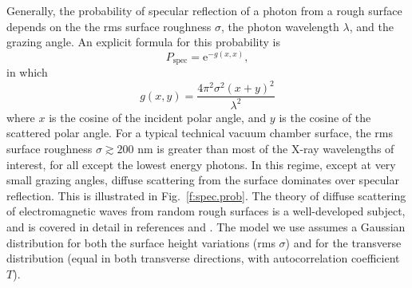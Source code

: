 \documentclass[11pt,openany]{report}
\begin{document}
Generally, the probability of specular reflection of a photon from a
rough surface depends on the the rms surface roughness $\sigma$, the
photon wavelength $\lambda$, and the grazing angle. An explicit
formula for this probability is~\cite{b:beckmann}
   \begin{equation}
P_{\textrm{spec}}=\textrm{e}^{-g(x,x)},
\end{equation}
in which
   \begin{equation}
g(x,y)=\frac{4\pi^{2}\sigma^{2}(x+y)^{2}}{\lambda^{2}}
  \end{equation}
where $x$ is the cosine of the incident polar angle, and $y$ is the
cosine of the scattered polar angle. For a typical technical vacuum
chamber surface, the rms surface roughness $\sigma \gtrsim 200$ nm is
greater than most of the X-ray wavelengths of interest, for all except
the lowest energy photons. In this regime, except at very small
grazing angles, diffuse scattering from the surface dominates over
specular reflection. This is illustrated in Fig.~\ref{f:spec.prob}.
The theory of diffuse scattering of electromagnetic waves from random
rough surfaces is a well-developed subject, and is covered in detail
in references \cite{b:beckmann} and \cite{b:ogilvy}. The model we use
assumes a Gaussian distribution for both the surface height variations
(rms $\sigma$) and for the transverse distribution (equal in both
transverse directions, with autocorrelation coefficient $T$).
\end{document}
